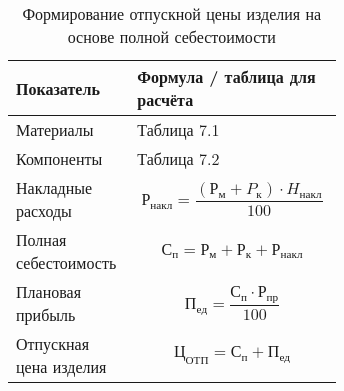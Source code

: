 \begin{table}[H]
  \small
  \caption{Формирование отпускной цены изделия на основе полной себестоимости}
\begin{tabular}{|p{0.25\linewidth} | p{0.40\linewidth}|}
  \hline
  Показатель & Формула / таблица для расчёта\\[0pt]
  \hline
  Материалы & Таблица 7.1\\[0pt]
  \hline
  Компоненты & Таблица 7.2\\[0pt]
  \hline
  Накладные расходы & \begin{equation}  Р_{накл}=\frac{(Р_м+P_к) \cdot H_{накл}}{100}    \end{equation} \\[0pt]
  \hline
  Полная себестоимость & \begin{equation} С_п =Р_м + Р_к + Р_{накл}  \end{equation} \\[0pt]
  \hline
  Плановая прибыль & \begin{equation}  П_{ед}= \frac{С_п \cdot Р_{пр}}{100} \end{equation}\\[0pt]
  \hline
  Отпускная цена изделия & \begin{equation}  Ц_{ОТП}=С_п+П_{ед}\end{equation}\\[0pt]
  \hline
\end{tabular}
\end{table}


